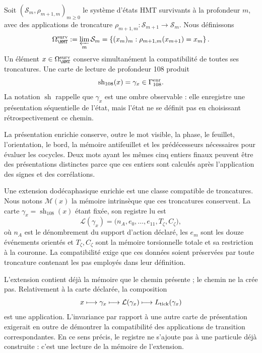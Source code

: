 Soit \((\mathcal S_m,\rho_{m+1,m})_{m\geq0}\) le système d'états HMT
survivants à la profondeur \(m\), avec des applications de troncature
\(\rho_{m+1,m}:\mathcal S_{m+1}\to\mathcal S_m\). Nous définissons
\[
 \Omega_{\HMT}^{\rm surv}
 :=\varprojlim_m\mathcal S_m
 =\left\{(x_m)_m:\rho_{m+1,m}(x_{m+1})=x_m\right\}.
\]
Un élément \(x\in\Omega_{\HMT}^{\rm surv}\) conserve simultanément la
compatibilité de toutes ses troncatures. Une carte de lecture de profondeur
108 produit
\[
 \operatorname{sh}_{108}(x)=\gamma_x\in\Gamma_{108}^{\rm enr}.
\]
La notation \(\operatorname{sh}\) rappelle que \(\gamma_x\) est une ombre
observable : elle enregistre une présentation séquentielle de l'état, mais l'état ne
se définit pas en choisissant rétrospectivement ce chemin.

La présentation enrichie conserve, outre le mot visible, la phase,
le feuillet, l'orientation, le bord, la mémoire antifeuillet et les prédécesseurs nécessaires pour
évaluer les cocycles. Deux mots ayant les mêmes cinq entiers finaux peuvent
être des présentations distinctes parce que ces entiers sont calculés après
l'application des signes et des corrélations.

\begin{definition}
Une extension dodécaphasique enrichie est une classe compatible de
troncatures. Nous notons \(\mathscr M(x)\) la mémoire intrinsèque que ces
troncatures conservent. La carte
\(\gamma_x=\operatorname{sh}_{108}(x)\) étant fixée, son registre lu est
\[
 \mathcal L(\gamma_x)
 =\bigl(n_A,e_0,\ldots,e_{11},T_\zeta,C_\zeta\bigr),
\]
où \(n_A\) est le dénombrement du support d'action déclaré, les \(e_m\) sont
les douze événements orientés et \(T_\zeta,C_\zeta\) sont la mémoire torsionnelle
totale et sa restriction à la couronne. La compatibilité exige que ces données
soient préservées par toute troncature contenant les pas employés dans leur
définition.
\end{definition}

L'extension contient déjà la mémoire que le chemin présente ; le chemin ne la crée pas.
Relativement à la carte déclarée, la composition
\[
x\longmapsto\gamma_x
\longmapsto\mathcal L(\gamma_x)
\longmapsto L_{\rm tick}(\gamma_x)
\]
est une application. L'invariance par rapport à une autre carte de présentation
exigerait en outre de démontrer la compatibilité des applications
de transition correspondantes. En ce sens précis, le registre ne s'ajoute pas à une
particule déjà construite : c'est une lecture de la mémoire de l'extension.

